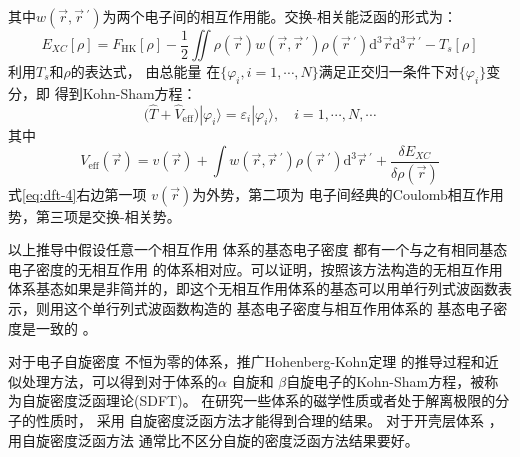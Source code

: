 其中{$w(\vec r, \vec r\,^{\prime})$为两个电子间的相互作用能。}交换-相关能泛函的形式为：
\begin{equation} 
  \label{eq:dft-2}
  E_{XC}[\rho]=F_{\mathrm{HK}}[\rho]-\frac 12\iint{\rho(\vec{r}) w(\vec{r},\vec r\,^{\prime})\rho(\vec r\,^{\prime})\textrm{d}^3\vec{r}\textrm{d}^3\vec r\,^{\prime}}-T_{s}[\rho]
\end{equation}
利用$T_s$和$\rho$的表达式，%
{由}总能量%
{在$\{\varphi_i, i\!=\!1,\cdots, N\}$满足正交归一条件下对$\{\varphi_i\}$}变分，即%
得到Kohn-Sham方程：
\begin{equation} \label{eq:dft-3}
	\bigl(\hat{T}+\hat{V}_{\mathrm{eff}}\bigr)|\varphi_{i}\rangle=\varepsilon_{i}|\varphi_{i}\rangle{,\quad i=1,\cdots,N,\cdots}
\end{equation}
其中
\begin{equation} \label{eq:dft-4}
	V_{\mathrm{eff}}(\vec{r})={v}(\vec{r})+\int{w(\vec{r},\vec r\,^{\prime})\rho(\vec r\,^{\prime})\textrm{d}^3{\vec r\,^{\prime}}+\frac{\delta E_{XC}}{\delta\rho(\vec{r})
}}
\end{equation}
式\eqref{eq:dft-4}右边第一项%
${v}(\vec{r})
$为外势，第二项为%
{电}子间经典的{Coulomb}相互作用势，第三项是交换-相关势。%

以上推导中假设任意一个相互作用%
{体系的基态电}子密度%
{都有一个}与之有相同基态电子密度的无相互作用%
{的体系相对应}。可以证明，按照该方法构造的无相互作用体系基态如果是非简并的，即这个无相互作用体系的基态可以用单行列式波函数表示，则用这个单行列式波函数构造的%
{基态电}子密度与相互作用体系的%
{基态电}子密度是一致的%
。\cite{PNAS76-6062_1979,IJQC24-243_1983}

对于{电子}自旋{密度}%
{不恒为零的体系，推广}Hohenberg-Kohn定理%
{的推导过程和近似处理方法，可以得到对于体系的}$\alpha$%
自旋和%
{$\beta$自旋}电子的{\textrm{Kohn-Sham}方程，被称为自旋密度泛函理论\textrm{(SDFT)}。}%
{在}研究一些体系的磁学性质或者处于解离极限的分子的性质{时}，%
采用%
自旋密度泛函方法才能得到合理的结果{。}%
对于开壳层体系%
，用自旋密度泛函方法%
通常比不{区}分自旋的密度泛函方法结果要好。%

